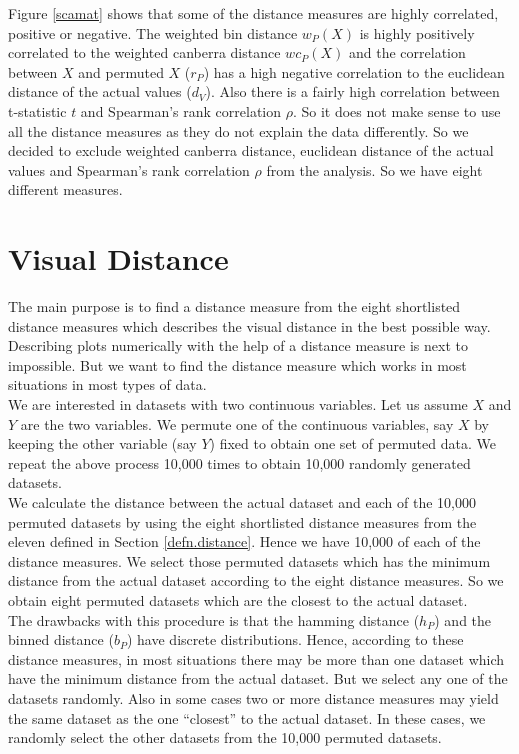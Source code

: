 \documentclass[12]{report}
\begin{document}
Figure \ref{scamat} shows that some of the distance measures are highly correlated, positive or negative. The weighted bin distance $w_P(X)$ is highly positively correlated to the weighted canberra distance $wc_P(X)$ and the correlation between $X$ and permuted $X$ ($r_P$) has a high negative correlation to the euclidean distance of the actual values ($d_V$). Also there is a fairly high correlation between t-statistic $t$ and Spearman's rank correlation $\rho$.  So it does not make sense to use all the distance measures as they do not explain the data differently. So we decided to exclude weighted canberra distance, euclidean distance of the actual values and Spearman's rank correlation $\rho$ from the analysis. So we have eight different measures.

\section{Visual Distance}

The main purpose is to find a distance measure from the eight shortlisted distance measures which describes the visual distance in the best possible way. Describing plots numerically with the help of a distance measure is next to impossible. But we want to find the distance measure which works in most situations in most types of data. \\

We are interested in datasets with two continuous variables. Let us assume $X$ and $Y$ are the two variables.  We permute one of the continuous variables, say $X$ by keeping the other variable (say $Y$) fixed to obtain one set of permuted data. We repeat the above process 10,000 times to obtain 10,000 randomly generated datasets. \\

We calculate the distance between the actual dataset and each of the 10,000 permuted datasets by using the eight shortlisted distance measures from the eleven defined in Section \ref{defn.distance}. Hence we have 10,000 of each of the distance measures. We select those permuted datasets which has the minimum distance from the actual dataset according to the eight distance measures. So we obtain eight permuted datasets which are the closest to the actual dataset. \\

The drawbacks with this procedure is that the hamming distance ($h_P$)  and the binned distance ($b_P$) have discrete distributions. Hence, according to these distance measures, in most situations there may be more than one dataset which have the minimum distance from the actual dataset. But we select any one of the datasets randomly. Also in some cases two or more distance measures may yield the same dataset as the one ``closest'' to the actual dataset. In these cases, we randomly select the other datasets from the 10,000 permuted datasets.   \\
\end{document}
